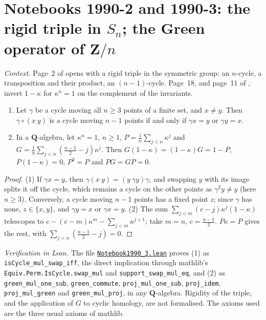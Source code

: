 \section[Notebooks 1990-2, 1990-3: rigid triple; Green operator]{Notebooks 1990-2 and 1990-3: the rigid triple in $S_n$; the Green operator of $\mathbf Z/n$\protect{}}\label{sec:quillen-1990-3}

\emph{Context.} Page~2 of  opens with a rigid triple in the symmetric group: an $n$-cycle, a transposition and their product, an $(n - 1)$-cycle. Page~18, and page~11 of , invert $1 - \kappa$ for $\kappa^n = 1$ on the complement of the invariants.

\begin{encadre}
\begin{theoreme}\label{thm:quillen-1990-3}\leavevmode
\begin{enumerate}
\item Let $\gamma$ be a cycle moving all $n \ge 3$ points of a finite set, and $x \ne y$. Then $\gamma\circ(x\ y)$ is a cycle moving $n - 1$ points if and only if $\gamma x = y$ or $\gamma y = x$.
\item In a $\mathbf Q$-algebra, let $\kappa^n = 1$, $n \ge 1$, $P = \frac1n\sum_{j<n}\kappa^j$ and $G = \frac1n\sum_{j<n}(\frac{n-1}2 - j)\kappa^j$. Then $G(1 - \kappa) = (1 - \kappa)G = 1 - P$, $P(1 - \kappa) = 0$, $P^2 = P$ and $PG = GP = 0$.
\end{enumerate}
\end{theoreme}
\end{encadre}

\begin{proof}
(1) If $\gamma x = y$, then $\gamma(x\ y) = (y\ \gamma y)\gamma$, and swapping $y$ with its image splits it off the cycle, which remains a cycle on the other points as $\gamma^2y \ne y$ (here $n \ge 3$). Conversely, a cycle moving $n - 1$ points has a fixed point $z$; since $\gamma$ has none, $z \in \{x, y\}$, and $\gamma y = x$ or $\gamma x = y$. (2) The sum $\sum_{j<m}(c - j)\kappa^j(1 - \kappa)$ telescopes to $c - (c - m)\kappa^m - \sum_{j<m}\kappa^{j+1}$; take $m = n$, $c = \frac{n-1}2$. $P\kappa = P$ gives the rest, with $\sum_{j<n}(\frac{n-1}2 - j) = 0$.
\end{proof}

\emph{Verification in Lean.} The file \href{\leanblobmain/Notebook1990_3.lean}{\texttt{Notebook1990\_3.\allowbreak{}lean}} proves (1) as \texttt{isCycle\_mul\_swap\_iff}, the direct implication through mathlib's \texttt{Equiv.Perm.IsCycle.swap\_mul} and \texttt{support\_swap\_mul\_eq}, and (2) as \texttt{green\_mul\_one\_sub}, \texttt{green\_commute}, \texttt{proj\_mul\_one\_sub}, \texttt{proj\_idem}, \texttt{proj\_mul\_green} and \texttt{green\_mul\_proj}, in any $\mathbf Q$-algebra. Rigidity of the triple, and the application of $G$ to cyclic homology, are not formalised. The axioms used are the three usual axioms of mathlib.

